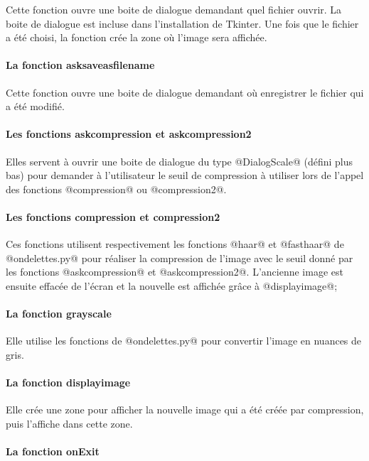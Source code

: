 \documentclass{article}
\begin{document}
Cette fonction ouvre une boite de dialogue demandant quel fichier ouvrir. La boite de dialogue est incluse dans l'installation de Tkinter.
Une fois que le fichier a été choisi, la fonction crée la zone où l'image sera affichée.

\paragraph{La fonction asksaveasfilename}

Cette fonction ouvre une boite de dialogue demandant où enregistrer le fichier qui a été modifié.

\paragraph{Les fonctions askcompression et askcompression2}

Elles servent à ouvrir une boite de dialogue du type @DialogScale@ (défini plus bas) pour demander à l'utilisateur le seuil de compression à utiliser lors de l'appel des fonctions @compression@ ou @compression2@.


\paragraph{Les fonctions compression et compression2}

Ces fonctions utilisent respectivement les fonctions @haar@ et @fasthaar@ de @ondelettes.py@ pour réaliser la compression de l'image avec le seuil donné par les fonctions @askcompression@ et @askcompression2@. L'ancienne image est ensuite effacée de l'écran et la nouvelle est affichée grâce à @displayimage@;

\paragraph{La fonction grayscale}

Elle utilise les fonctions de @ondelettes.py@ pour convertir l'image en nuances de gris.

\paragraph{La fonction displayimage}

Elle crée une zone pour afficher la nouvelle image qui a été créée par compression, puis l'affiche dans cette zone.

\paragraph{La fonction onExit}
\end{document}
